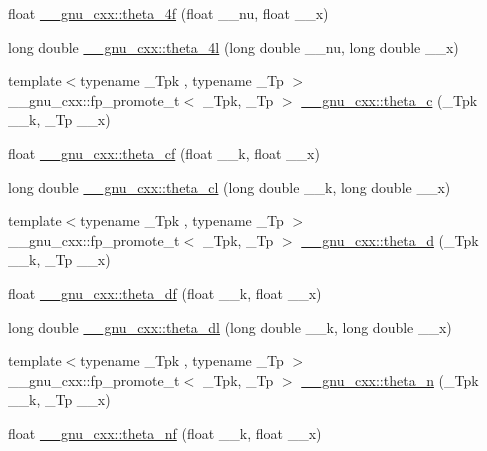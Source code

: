 \begin{DoxyCompactItemize}
float \hyperlink{group__gnu__math__spec__func_ga0c5cbf87e304844ed4c3423be5ca09a5}{\+\_\+\+\_\+gnu\+\_\+cxx\+::theta\+\_\+4f} (float \+\_\+\+\_\+nu, float \+\_\+\+\_\+x)
\item 
long double \hyperlink{group__gnu__math__spec__func_gaaf63a80e90cdcdd66ebb18cd3a84afae}{\+\_\+\+\_\+gnu\+\_\+cxx\+::theta\+\_\+4l} (long double \+\_\+\+\_\+nu, long double \+\_\+\+\_\+x)
\item 
{\footnotesize template$<$typename \+\_\+\+Tpk , typename \+\_\+\+Tp $>$ }\\\+\_\+\+\_\+gnu\+\_\+cxx\+::fp\+\_\+promote\+\_\+t$<$ \+\_\+\+Tpk, \+\_\+\+Tp $>$ \hyperlink{group__gnu__math__spec__func_ga3ebbb6513c39e1d55b08cba7d169ce3d}{\+\_\+\+\_\+gnu\+\_\+cxx\+::theta\+\_\+c} (\+\_\+\+Tpk \+\_\+\+\_\+k, \+\_\+\+Tp \+\_\+\+\_\+x)
\item 
float \hyperlink{group__gnu__math__spec__func_ga409f898afeaad5e25726ad552cfe6946}{\+\_\+\+\_\+gnu\+\_\+cxx\+::theta\+\_\+cf} (float \+\_\+\+\_\+k, float \+\_\+\+\_\+x)
\item 
long double \hyperlink{group__gnu__math__spec__func_ga0531098c628999cf396217ff997cfdda}{\+\_\+\+\_\+gnu\+\_\+cxx\+::theta\+\_\+cl} (long double \+\_\+\+\_\+k, long double \+\_\+\+\_\+x)
\item 
{\footnotesize template$<$typename \+\_\+\+Tpk , typename \+\_\+\+Tp $>$ }\\\+\_\+\+\_\+gnu\+\_\+cxx\+::fp\+\_\+promote\+\_\+t$<$ \+\_\+\+Tpk, \+\_\+\+Tp $>$ \hyperlink{group__gnu__math__spec__func_ga258edb995137d9e6344b3cd750266d74}{\+\_\+\+\_\+gnu\+\_\+cxx\+::theta\+\_\+d} (\+\_\+\+Tpk \+\_\+\+\_\+k, \+\_\+\+Tp \+\_\+\+\_\+x)
\item 
float \hyperlink{group__gnu__math__spec__func_gad2dc6fcaf54d25cbfaad082623941118}{\+\_\+\+\_\+gnu\+\_\+cxx\+::theta\+\_\+df} (float \+\_\+\+\_\+k, float \+\_\+\+\_\+x)
\item 
long double \hyperlink{group__gnu__math__spec__func_gacce4474168b9638ebeaad1c7b351fa04}{\+\_\+\+\_\+gnu\+\_\+cxx\+::theta\+\_\+dl} (long double \+\_\+\+\_\+k, long double \+\_\+\+\_\+x)
\item 
{\footnotesize template$<$typename \+\_\+\+Tpk , typename \+\_\+\+Tp $>$ }\\\+\_\+\+\_\+gnu\+\_\+cxx\+::fp\+\_\+promote\+\_\+t$<$ \+\_\+\+Tpk, \+\_\+\+Tp $>$ \hyperlink{group__gnu__math__spec__func_ga202778bd650e04e9f3729bfca35c32e2}{\+\_\+\+\_\+gnu\+\_\+cxx\+::theta\+\_\+n} (\+\_\+\+Tpk \+\_\+\+\_\+k, \+\_\+\+Tp \+\_\+\+\_\+x)
\item 
float \hyperlink{group__gnu__math__spec__func_ga5298a95e02bd909d55e59c1f2a0b51f8}{\+\_\+\+\_\+gnu\+\_\+cxx\+::theta\+\_\+nf} (float \+\_\+\+\_\+k, float \+\_\+\+\_\+x)

\end{DoxyCompactItemize}
